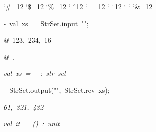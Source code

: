 \begin{list}{}
{\setlength{\leftmargin}{\leftmargini}
\setlength{\rightmargin}{0cm}
\setlength{\itemindent}{0cm}
\setlength{\listparindent}{0cm}
\setlength{\itemsep}{0cm}
\setlength{\parsep}{0cm}
\setlength{\labelsep}{0cm}
\setlength{\labelwidth}{0cm}
\catcode`\#=12
\catcode`\$=12
\catcode`\%=12
\catcode`\^=12
\catcode`\_=12
\catcode`\.=12
\catcode`
\catcode`
\catcode`\&=12
\ttfamily}
\small
\item[]\textsl{-\ }val\ xs\ =\ StrSet.input\ "";
\item[]\textsl{@\ }123,\ 234,\ 16
\item[]\textsl{@\ }.
\item[]\textsl{val\ xs\ =\ -\ :\ str\ set}
\item[]\textsl{-\ }StrSet.output("",\ StrSet.rev\ xs);
\item[]\textsl{61,\ 321,\ 432}
\item[]\textsl{val\ it\ =\ ()\ :\ unit}
\end{list}
